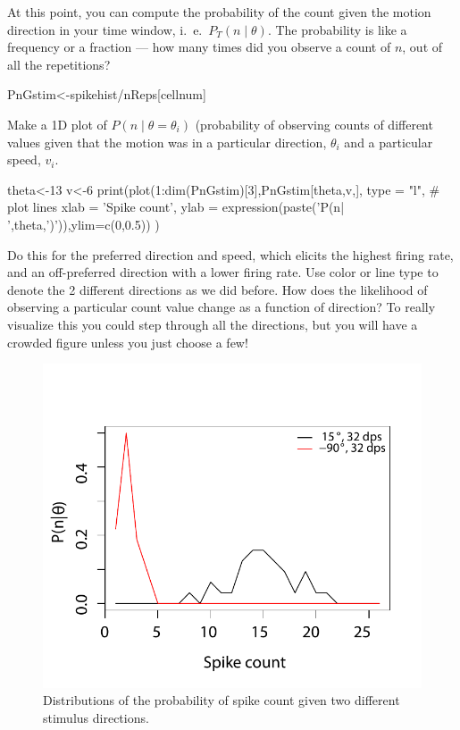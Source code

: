 \documentclass[
letterpaper, %
11pt, %
 oneside, 
onecolumn, %
]{memoir}
\numberwithin{Exercise}{chapter}
\begin{document}
At this point, you can compute the probability of the count given the motion direction in your time window, i.\ e.\ 
 $P_{T}(n \mid \theta)$.  The probability is like a frequency or a fraction --- how many times did you observe a count of $n$, out of all the repetitions?  

\begin{shortrcode}
PnGstim<-spikehist/nReps[cellnum]
\end{shortrcode}


Make a 1D plot of $P(n \mid \theta=\theta_{i})$ (probability of observing counts of different values given that the motion was in a particular direction, $\theta_i$ and a particular speed, $v_i$.  

\begin{shortrcode}
theta<-13
v<-6
print(plot(1:dim(PnGstim)[3],PnGstim[theta,v,],
      type = "l", # plot lines
      xlab = 'Spike count',
      ylab = expression(paste('P(n| ',theta,')')),ylim=c(0,0.5))
)
\end{shortrcode}


Do this for the preferred direction and speed, which elicits the highest firing rate, and an off-preferred direction with a lower firing rate.  Use color or line type to denote the 2 different directions as we did before.  How does the likelihood of observing a particular count value change as a function of direction? To really visualize this you could step through all the directions, but you will have a crowded figure unless you just choose a few!  
\begin{figure}
\centering
\includegraphics[scale=0.7]{conditionalcount} 
\caption{Distributions of the probability of spike count given two different stimulus directions.}
\end{figure}
\end{document}

